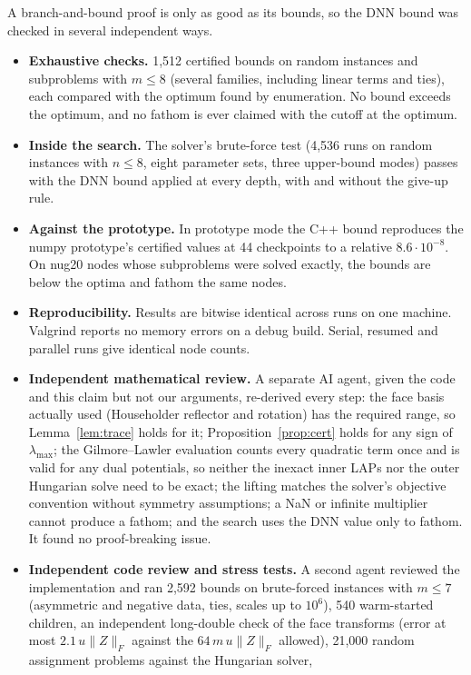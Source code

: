 \documentclass[11pt]{article}
\theoremstyle{remark}
\newcommand{\lmax}{\lambda_{\max}}
\begin{document}
A branch-and-bound proof is only as good as its bounds, so the DNN bound was
checked in several independent ways.
\begin{itemize}
\item \textbf{Exhaustive checks.} 1,512 certified bounds on random instances and
  subproblems with $m\le8$ (several families, including linear terms and ties),
  each compared with the optimum found by enumeration. No bound exceeds the
  optimum, and no fathom is ever claimed with the cutoff at the optimum.
\item \textbf{Inside the search.} The solver's brute-force test (4,536 runs on
  random instances with $n\le 8$, eight parameter sets, three upper-bound modes)
  passes with the DNN bound applied at every depth, with and without the give-up
  rule.
\item \textbf{Against the prototype.} In prototype mode the C++ bound reproduces the
  numpy prototype's certified values at 44 checkpoints to a relative $8.6\cdot10^{-8}$.
  On nug20 nodes whose subproblems were solved exactly, the bounds are below the
  optima and fathom the same nodes.
\item \textbf{Reproducibility.} Results are bitwise identical across runs on one
  machine. Valgrind reports no memory errors on a debug build. Serial, resumed and
  parallel runs give identical node counts.
\item \textbf{Independent mathematical review.} A separate AI agent, given the code
  and this claim but not our arguments, re-derived every step: the face basis
  actually used (Householder reflector and rotation) has the required range, so
  Lemma~\ref{lem:trace} holds for it; Proposition~\ref{prop:cert} holds for any
  sign of $\lmax$; the Gilmore--Lawler evaluation counts every quadratic term
  once and is valid for any dual potentials, so neither the inexact inner LAPs
  nor the outer Hungarian solve need to be exact; the lifting matches the
  solver's objective convention without symmetry assumptions; a NaN or infinite
  multiplier cannot produce a fathom; and the search uses the DNN value only to
  fathom. It found no proof-breaking issue.
\item \textbf{Independent code review and stress tests.} A second agent reviewed
  the implementation and ran 2,592 bounds on brute-forced instances with
  $m\le7$ (asymmetric and negative data, ties, scales up to $10^6$), 540
  warm-started children, an independent long-double check of the face
  transforms (error at most $2.1\,u\|Z\|_F$ against the $64\,m\,u\|Z\|_F$
  allowed), 21,000 random assignment problems against the Hungarian solver,

\end{itemize}
\end{document}
